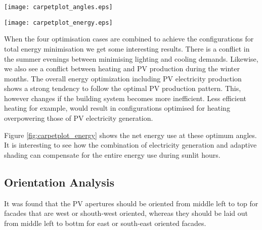 	\begin{figure*}
	\begin{center}
	\texttt{[image: carpetplot\_angles.eps]}
	\caption{Carpet plots detailing the optimal configuration to minimise the (a) heating demand, (b) cooling demand, (c) lighting demand, and (d) maximise irradiance on PV panels. Each configuration is represented by an angle of orientation around the x-axis (Altitude) and y-axis (Azimuth) as seen in the legend. Figure (e) details the combinations for optimum building thermal management without PV production. (f) also includes the PV production}
	\label{fig:carpetplot}
	\end{center}
	\end{figure*}

	\begin{figure*}
	\begin{center}
	\texttt{[image: carpetplot\_energy.eps]}
	\caption{Carpet plots detailing the net energy consumption. Each square represents the total energy consumption for that specific hour of the entire month. Red colours detail the energy demand, while blue colours detail the energy supply.}
	\label{fig:carpetplot_energy}
	\end{center}
	\end{figure*}



	When the four optimisation cases are combined to achieve the configurations for total energy minimisation we get some interesting results. There is a conflict in the summer evenings between minimising lighting and cooling demands. Likewise, we also see a conflict between heating and PV production during the winter months. The overall energy optimization including PV electricity production shows a strong tendency to follow the optimal PV production pattern. This, however changes if the building system becomes more inefficient. Less efficient heating for example, would result in configurations optimised for heating overpowering those of PV electricity generation.


	Figure \ref{fig:carpetplot_energy} shows the net energy use at these optimum angles. It is interesting to see how the combination of electricity generation and adaptive shading can compensate for the entire energy use during sunlit hours.

	\subsection{Orientation Analysis}

		It was found that the PV apertures should be oriented from middle left to top for facades that are west or shouth-west oriented, whereas they should be laid out from middle left to bottm for east or south-east oriented facades. 